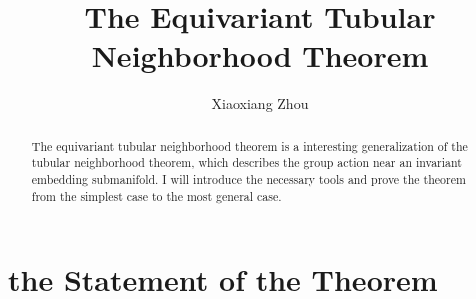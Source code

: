 \documentclass[reqno,11pt]{amsart}
\numberwithin{equation}{section}
\theoremstyle{plain}
\theoremstyle{plain}
\numberwithin{equation}{section}
\theoremstyle{remark}
\begin{document}
\date{}

\title
{The Equivariant Tubular Neighborhood Theorem}


\author{Xiaoxiang Zhou}
\address{School of Mathematical Sciences\\
University of Science and Technology of China\\
Hefei, 230026\\ P.R. China\\} 





\begin{abstract}
The equivariant tubular neighborhood theorem is a interesting generalization of the tubular neighborhood theorem, which describes the group action near an invariant embedding submanifold. I will introduce the necessary tools and prove the theorem from the simplest case to the most general case.
\end{abstract}



\maketitle


\section{the Statement of the Theorem}
	
\end{document}
